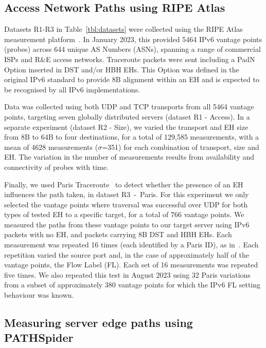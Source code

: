 \documentclass[conference]{IEEEtran}
\begin{document}
\subsection{Access Network Paths using RIPE Atlas}
\label{sec:ripe-methodology}

Datasets R1-R3 in Table~\ref{tbl:datasets} were collected using the RIPE Atlas
measurement platform~\cite{bajpai2015lessons}.  In January 2023, this provided 5464
IPv6 vantage points (probes) across 644 unique AS Numbers (ASNs), spanning a
range of commercial ISPs and R\&E access networks.  
Traceroute packets were sent including a PadN Option inserted in DST and/or HBH EHs. This Option
was defined in the original IPv6 standard to provide 8B alignment within an EH
and is expected to be recognised by all IPv6 implementations.  

Data was collected using both UDP and TCP transports from all 5464 vantage
points, targeting seven globally distributed servers (dataset R1 - Access).  In a
separate experiment (dataset R2 - Size), we varied the transport and EH size from 8B to 64B to four destinations, for a total of 129,585 measurements, with a mean of 4628 measurements ($\sigma$=351) for each combination of transport, size and EH. The variation in the number of measurements results from availability and connectivity of probes with time.


Finally, we used Paris Traceroute~\cite{augustin2006avoiding} to detect
whether the presence of an EH influences the path taken, in dataset R3~-~Paris. For this experiment we only
selected the vantage points where traversal was successful over UDP for both types
of tested EH to a specific target, for a total of 766 vantage points.
We measured the paths from these vantage points to our target server using IPv6 packets with no EH, and packets carrying 8B
DST and HBH EHs. Each measurement was repeated 16 times (each identified by  a
Paris ID), as in~\cite{augustin2006avoiding}. Each repetition varied the source
port and, in the case of approximately half of the vantage points, the Flow Label (FL).
Each set of 16 measurements was repeated five times.
We also repeated this test in August 2023 using 32 Paris variations from a subset of approximately 380 vantage points for which the IPv6 FL setting behaviour was known.

\subsection{Measuring server edge paths using PATHSpider}
\label{sec:pathspider-methodology}
\end{document}
